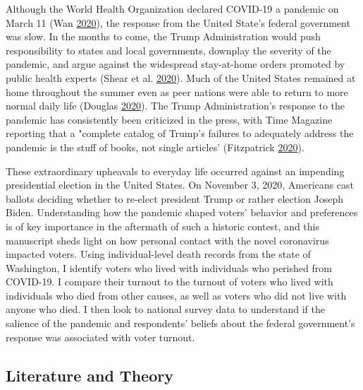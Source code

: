 \documentclass[
  12pt,
]{article}
\begin{document}
Although the World Health Organization declared COVID-19 a pandemic on March 11 (Wan \protect\hyperlink{ref-Wan2020}{2020}), the response from the United State's federal government was slow. In the months to come, the Trump Administration would push responsibility to states and local governments, downplay the severity of the pandemic, and argue against the widespread stay-at-home orders promoted by public health experts (Shear et al. \protect\hyperlink{ref-Shear2020}{2020}). Much of the United States remained at home throughout the summer even as peer nations were able to return to more normal daily life (Douglas \protect\hyperlink{ref-Douglas2020}{2020}). The Trump Administration's response to the pandemic has consistently been criticized in the press, with Time Magazine reporting that a "complete catalog of Trump's failures to adequately address the pandemic is the stuff of books, not single articles' (Fitzpatrick \protect\hyperlink{ref-Fitzpatrick2020}{2020}).

These extraordinary upheavals to everyday life occurred against an impending presidential election in the United States. On November 3, 2020, Americans cast ballots deciding whether to re-elect president Trump or rather election Joseph Biden. Understanding how the pandemic shaped voters' behavior and preferences is of key importance in the aftermath of such a historic contest, and this manuscript sheds light on how personal contact with the novel coronavirus impacted voters. Using individual-level death records from the state of Washington, I identify voters who lived with individuals who perished from COVID-19. I compare their turnout to the turnout of voters who lived with individuals who died from other causes, as well as voters who did not live with anyone who died. I then look to national survey data to understand if the salience of the pandemic and respondents' beliefs about the federal government's response was associated with voter turnout.

\hypertarget{literature-and-theory}{%
\subsection*{Literature and Theory}\label{literature-and-theory}}
\end{document}
